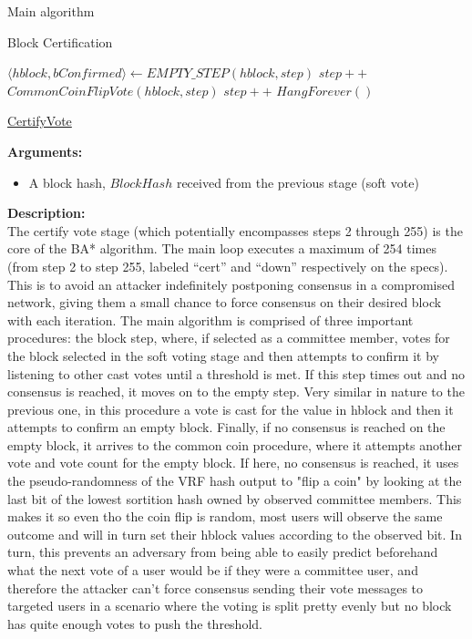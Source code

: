 \documentclass[10pt,a4paper]{article}
\begin{document}
\begin{section}{Main algorithm}
\begin{subsection}{Block Certification}
\begin{algorithm}[H]
\begin{algorithmic}[H]
            \State $ \langle hblock, bConfirmed \rangle \gets EMPTY\_STEP(hblock,step)$
            \EndIf
            \State $step++$\\
    
            \State $CommonCoinFlipVote(hblock, step)$
            \State $step++$
        \EndWhile
        \State $HangForever()$
        \EndFunction
        \end{algorithmic}
        \caption{\underline{CertifyVote}}
    \end{algorithm}
    
\noindent \textbf{Arguments:}
\begin{itemize}
    \item A block hash, $BlockHash$ received from the previous stage (soft vote)
  \end{itemize}

\noindent \textbf{Description:}\\
The certify vote stage (which potentially encompasses steps 2 through 255) is the core of the BA* algorithm.
The main loop executes a maximum of 254 times (from step 2 to step 255, labeled ``cert'' and ``down'' 
respectively on the specs).
This is to avoid an attacker indefinitely postponing consensus in a compromised network, giving them a 
small chance to force consensus on their desired block with each iteration.
The main algorithm is comprised of three important procedures: the block step, where, if selected as a 
committee member, votes for the block selected in the soft voting stage and then attempts to confirm it 
by listening to other cast votes until a threshold is met.
If this step times out and no consensus is reached, it moves on to the empty step. Very similar in nature 
to the previous one, in this procedure a vote is cast for the value in hblock and then it attempts to 
confirm an empty block.
Finally, if no consensus is reached on the empty block, it arrives to the common coin procedure, where 
it attempts another vote and vote count for the empty block. If here, no consensus is reached, it uses 
the pseudo-randomness of the VRF hash output to "flip a coin" by looking at the last bit of the lowest 
sortition hash owned by observed committee members.
This makes it so even tho the coin flip is random, most users will observe the same outcome and will 
in turn set their hblock values according to the observed bit. In turn, this prevents an adversary 
from being able to easily predict beforehand what the next vote of a user would be if they were a 
committee user, and therefore the attacker can't force consensus 
sending their vote messages to targeted users in a scenario where the voting is split pretty evenly 
but no block has quite enough votes to push the threshold.\\


\end{subsection}
\end{section}
\end{document}
